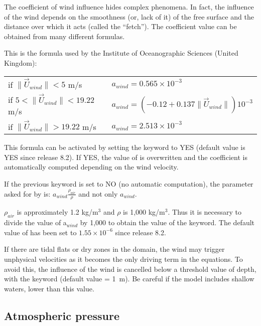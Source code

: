 The coefficient of wind influence hides complex phenomena.
In fact, the influence of the wind depends on the smoothness (or, lack of it)
of the free surface and the distance over which it acts (called the ``fetch'').
The coefficient value can be obtained from many different formulas.

This is the formula used by the Institute of Oceanographic Sciences
(United Kingdom):


\begin{tabular}{ll}

if $\| \vec{U}_{wind} \| < 5$ m/s & $a_{wind}  = 0.565 \times 10^{-3}$ \\
if $5 < \| \vec{U}_{wind} \| < 19.22$ m/s &
 $a_{wind} = (- 0.12 + 0.137 \| \vec{U}_{wind} \| ) 10^{-3}$ \\
if $\| \vec{U}_{wind} \| > 19.22$ m/s & $a_{wind} = 2.513 \times 10^{-3}$ \\
\end{tabular}


This formula can be activated by setting the keyword
 to YES
(default value is YES since release 8.2).
If YES, the value of  is overwritten and
the coefficient is automatically computed depending on the wind velocity.

If the previous keyword is set to NO (no automatic computation), the parameter
 asked for by  is:
$a_{wind} \frac{\rho_{air}}{\rho}$ and not only $a_{wind}$.

$\rho_{air}$ is approximately 1.2 kg/m$^3$ and $\rho$ is 1,000 kg/m$^3$.
Thus it is necessary to divide the value of a$_{wind}$ by 1,000
to obtain the value of the  keyword.
The default value of  has been set to
$1.55 \times 10^{-6}$ since release 8.2.

If there are tidal flats or dry zones in the domain, the wind may trigger
unphysical velocities as it becomes the only driving term in the equations.
To avoid this, the influence of the wind is cancelled below a threshold value
of depth, with the keyword 
(default value = 1~m).
Be careful if the model includes shallow waters, lower than this value.

\subsection{Atmospheric pressure}


